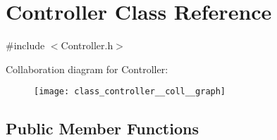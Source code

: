 \hypertarget{class_controller}{\section{Controller Class Reference}
\label{class_controller}
}


{\ttfamily \#include $<$Controller.\-h$>$}



Collaboration diagram for Controller\-:\nopagebreak
\begin{figure}[H]
\begin{center}
\leavevmode
\texttt{[image: class\_controller\_\_coll\_\_graph]}
\end{center}
\end{figure}
\subsection*{Public Member Functions}

